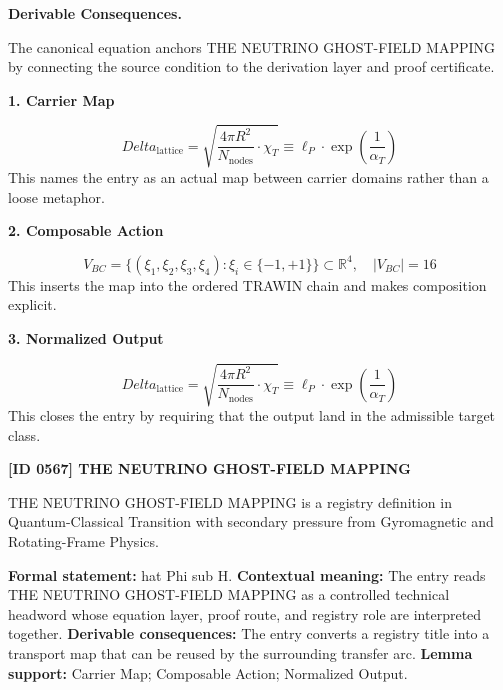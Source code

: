 \par\vspace{0.35em}
\noindent\textbf{Derivable Consequences.}\quad
\begingroup
\footnotesize
\raggedright
The canonical equation anchors THE NEUTRINO GHOST-FIELD MAPPING by connecting the source condition to the derivation layer and proof certificate.
\par\endgroup

\noindent\textbf{1. Carrier Map}\par
\[
Delta_{\text{lattice}} = \sqrt{\frac{4\pi R^2}{N_{\text{nodes}}} \cdot \chi_T} \equiv \ell_P \cdot \exp\left( \frac{1}{\alpha_T} \right)
\]
\noindent This names the entry as an actual map between carrier domains rather than a loose metaphor.\par
\noindent\textbf{2. Composable Action}\par
\[
V_{BC} = \{ (\xi_1, \xi_2, \xi_3, \xi_4) : \xi_i \in \{ -1, +1 \} \} \subset \mathbb{R}^4, \quad |V_{BC}| = 16
\]
\noindent This inserts the map into the ordered TRAWIN chain and makes composition explicit.\par
\noindent\textbf{3. Normalized Output}\par
\[
Delta_{\text{lattice}} = \sqrt{\frac{4\pi R^2}{N_{\text{nodes}}} \cdot \chi_T} \equiv \ell_P \cdot \exp\left( \frac{1}{\alpha_T} \right)
\]
\noindent This closes the entry by requiring that the output land in the admissible target class.\par

\clearpage
\noindent\textbf{[ID 0567] THE NEUTRINO GHOST-FIELD MAPPING}\par
\vspace{0.35em}
\begingroup\small
{}
THE NEUTRINO GHOST-FIELD MAPPING is a registry definition in Quantum-Classical Transition with secondary pressure from Gyromagnetic and Rotating-Frame Physics.

\begingroup\footnotesize\setlength{\emergencystretch}{3em}\sloppy
\textbf{Formal statement:} hat Phi sub H. \textbf{Contextual meaning:} The entry reads THE NEUTRINO GHOST-FIELD MAPPING as a controlled technical headword whose equation layer, proof route, and registry role are interpreted together. \textbf{Derivable consequences:} The entry converts a registry title into a transport map that can be reused by the surrounding transfer arc. \textbf{Lemma support:} Carrier Map; Composable Action; Normalized Output.\par
\endgroup

